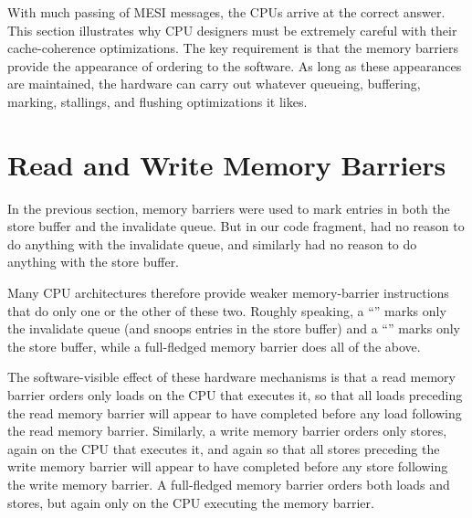 With much passing of MESI messages, the CPUs arrive at the correct answer.
This section illustrates why CPU designers must be extremely careful
with their cache-coherence optimizations.
The key requirement is that the memory barriers provide the appearance
of ordering to the software.
As long as these appearances are maintained, the hardware can carry
out whatever queueing, buffering, marking, stallings, and flushing
optimizations it likes.

\QuickQuizEnd

\section{Read and Write Memory Barriers}
\label{sec:app:whymb:Read and Write Memory Barriers}

In the previous section, memory barriers were used to mark entries in both
the store buffer and the invalidate queue.
But in our code fragment,  had no reason to do anything with the
invalidate queue, and  similarly had no reason to do anything
with the store buffer.

Many CPU architectures therefore provide weaker memory-barrier
instructions that do only one or the other of these two.
Roughly speaking, a ``'' marks only the invalidate
queue (and snoops entries in the store buffer) and a ``'' marks only the store buffer, while a full-fledged memory
barrier does all of the above.

The software-visible effect of these hardware mechanisms is that a read
memory barrier orders only loads on the CPU that executes it, so that
all loads preceding the read memory barrier will appear to have completed
before any load following the read memory barrier.
Similarly, a write memory barrier orders only stores, again on the
CPU that executes it, and again so that all stores preceding the write
memory barrier will appear to have completed before any store following
the write memory barrier.
A full-fledged memory barrier orders both loads and stores, but again
only on the CPU executing the memory barrier.

